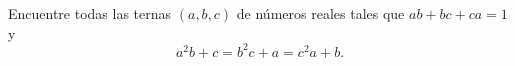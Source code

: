 Encuentre todas las ternas $(a, b, c)$ de números reales tales que $ab + bc + ca = 1$ y
\[a^2b + c = b^2c + a = c^2a + b.\]
